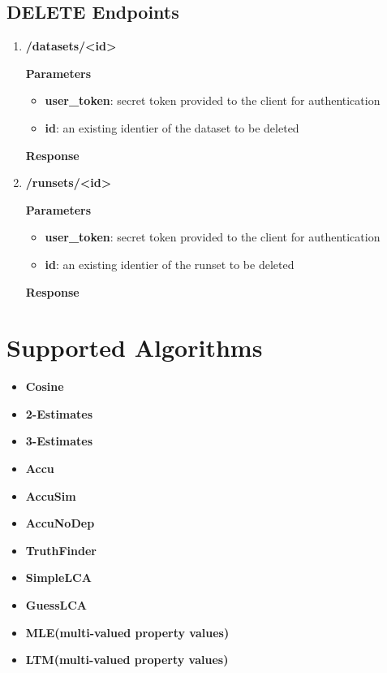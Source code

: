\documentclass[a4paper,10pt]{scrartcl}
\begin{document}
\subsection{DELETE Endpoints}
\begin{enumerate}
\item \textbf{/datasets/<id>}
\textbf{Parameters}
\begin{itemize}
 \item \textbf{user\_token}: secret token provided to the client for authentication
 \item \textbf{id}: an existing identier of the dataset to be deleted 
\end{itemize}
\textbf{Response}
%
\item \textbf{/runsets/<id>}
\textbf{Parameters}
\begin{itemize}
  \item \textbf{user\_token}: secret token provided to the client for authentication
 \item \textbf{id}: an existing identier of the runset to be deleted 
\end{itemize}
\textbf{Response}
\end{enumerate}

\section{Supported Algorithms}
\begin{itemize}
 \item \textbf{Cosine}
 \item \textbf{2-Estimates}
 \item \textbf{3-Estimates}
 \item \textbf{Accu}
 \item \textbf{AccuSim}
 \item \textbf{AccuNoDep}
 \item \textbf{TruthFinder}
 \item \textbf{SimpleLCA}
 \item \textbf{GuessLCA}
 \item \textbf{MLE(multi-valued property values)}
 \item \textbf{LTM(multi-valued property values)}
\end{itemize}
\end{document}
